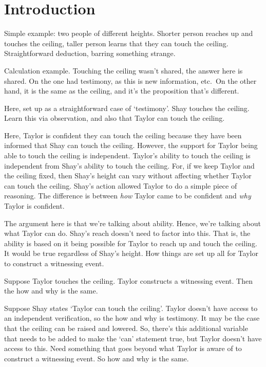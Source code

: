 \documentclass[10pt]{article}
\begin{document}
\newpage


\section{Introduction}
\label{sec:introduction}

Simple example: two people of different heights.
Shorter person reaches up and touches the ceiling, taller person learns that they can touch the ceiling.
Straightforward deduction, barring something strange.

Calculation example.
Touching the ceiling wasn't shared, the answer here is shared.
On the one had testimony, as this is new information, etc.\
On the other hand, it is the same as the ceiling, and it's the proposition that's different.

Here, set up as a straightforward case of `testimony'.
Shay touches the ceiling.
Learn this via observation, and also that Taylor can touch the ceiling.

Here, Taylor is confident they can touch the ceiling because they have been informed that Shay can touch the ceiling.
However, the support for Taylor being able to touch the ceiling is independent.
Taylor's ability to touch the ceiling is independent from Shay's ability to touch the ceiling.
For, if we keep Taylor and the ceiling fixed, then Shay's height can vary without affecting whether Taylor can touch the ceiling.
Shay's action allowed Taylor to do a simple piece of reasoning.
The difference is between \emph{how} Taylor came to be confident and \emph{why} Taylor is confident.

The argument here is that we're talking about ability.
Hence, we're talking about what Taylor can do.
Shay's reach doesn't need to factor into this.
That is, the ability is based on it being possible for Taylor to reach up and touch the ceiling.
It would be true regardless of Shay's height.
How things are set up all for Taylor to construct a witnessing event.

Suppose Taylor touches the ceiling.
Taylor constructs a witnessing event.
Then the how and why is the same.

Suppose Shay states `Taylor can touch the ceiling'.
Taylor doesn't have access to an independent verification, so the how and why is testimony.
It may be the case that the ceiling can be raised and lowered.
So, there's this additional variable that needs to be added to make the `can' statement true, but Taylor doesn't have access to this.
Need something that goes beyond what Taylor is aware of to construct a witnessing event.
So how and why is the same.
\end{document}
